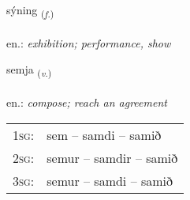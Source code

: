 \documentclass[frontgrid, backgrid]{flacards}\usepackage[]{graphicx}\usepackage[]{xcolor}
\begin{document}
\renewcommand{\flhead}{\vskip5pt \fboxsep=0pt {\small\bfseries\footnotesize Nafnorð | Noun}}
\renewcommand{\fcfoot}{\vskip5pt \fboxsep=0pt \hspace{2pt}{\small\bfseries\footnotesize 1K}}

\renewcommand{\blhead}{\vskip5pt {\small\bfseries\footnotesize Nafnorð | Noun }}
\renewcommand{\bcfoot}{\vskip5pt \hspace{2pt}{\small\bfseries\footnotesize 1K}}


{sýning \small{\textsubscript{(\textit{f.})}} \\[1ex] %
\textphonetic{[siːniŋk]} \\
en.: \emph{exhibition; performance, show} \\  [2ex]
\renewcommand*{\arraystretch}{0.8}
}

\renewcommand{\flhead}{\vskip5pt \fboxsep=0pt {\small\bfseries\footnotesize Sagnorð | Verb}}
\renewcommand{\fcfoot}{\vskip5pt \fboxsep=0pt \hspace{2pt}{\small\bfseries\footnotesize 1K}}

\renewcommand{\blhead}{\vskip5pt {\small\bfseries\footnotesize Sagnorð | Verb }}
\renewcommand{\bcfoot}{\vskip5pt \hspace{2pt}{\small\bfseries\footnotesize 1K}}


{semja \small{\textsubscript{(\textit{v.})}} \\[1ex] %
\textphonetic{[sɛmja]} \\
en.: \emph{compose; reach an agreement} \\  [2ex]
\renewcommand*{\arraystretch}{0.8}
\begin{tabular}{p{1cm}l}
\textsc{1sg}: & sem -- samdi -- samið \\ 
\textsc{2sg}: & semur -- samdir -- samið \\ 
\textsc{3sg}: & semur -- samdi -- samið \\ 
\end{tabular}
}
\end{document}
